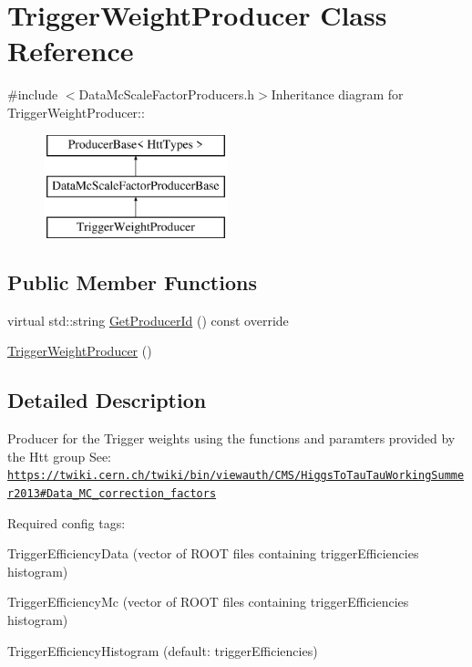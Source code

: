 \hypertarget{classTriggerWeightProducer}{
\section{TriggerWeightProducer Class Reference}
\label{classTriggerWeightProducer}
}


{\ttfamily \#include $<$DataMcScaleFactorProducers.h$>$}Inheritance diagram for TriggerWeightProducer::\begin{figure}[H]
\begin{center}
\leavevmode
\includegraphics[height=3cm]{classTriggerWeightProducer}
\end{center}
\end{figure}
\subsection*{Public Member Functions}
\begin{DoxyCompactItemize}
\item 
virtual std::string \hyperlink{classTriggerWeightProducer_ae1c96224d40a0964c2ea992591a6310e}{GetProducerId} () const override
\item 
\hyperlink{classTriggerWeightProducer_af3a739fe500b608be0d9fd7112823d72}{TriggerWeightProducer} ()
\end{DoxyCompactItemize}


\subsection{Detailed Description}
Producer for the Trigger weights using the functions and paramters provided by the Htt group See: \href{https://twiki.cern.ch/twiki/bin/viewauth/CMS/HiggsToTauTauWorkingSummer2013#Data_MC_correction_factors}{\tt https://twiki.cern.ch/twiki/bin/viewauth/CMS/HiggsToTauTauWorkingSummer2013\#Data\_\-MC\_\-correction\_\-factors}

Required config tags:
\begin{DoxyItemize}
\item TriggerEfficiencyData (vector of ROOT files containing triggerEfficiencies histogram)
\item TriggerEfficiencyMc (vector of ROOT files containing triggerEfficiencies histogram)
\item TriggerEfficiencyHistogram (default: triggerEfficiencies) 
\end{DoxyItemize}

